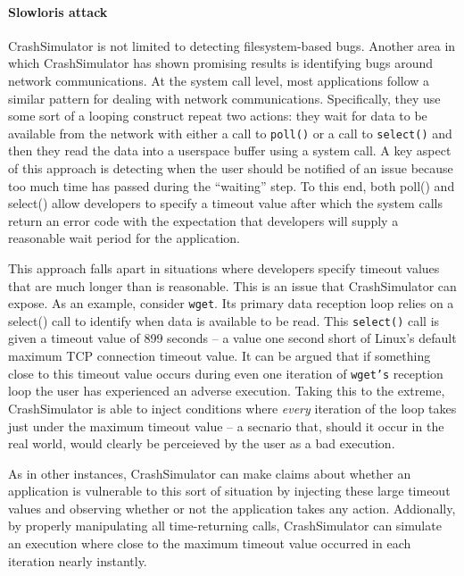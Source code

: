 \paragraph{Slowloris attack}

CrashSimulator is not limited to detecting filesystem-based bugs.  Another area in which CrashSimulator has
shown promising results is identifying bugs around network communications.  At the system call level, most
applications follow a similar pattern for dealing with network communications.  Specifically, they use some
sort of a looping construct repeat two actions: they wait for data to be available from the network with
either a call to {\tt poll()} or a call to {\tt select()} and then they read the data into a userspace
buffer using a system call.  A key aspect of this approach is detecting when the user should be notified of
an issue because too much time has passed during the ``waiting'' step.  To this end, both poll() and
select() allow developers to specify a timeout value after which the system calls return an error code with
the expectation that developers will supply a reasonable wait period for the application.

This approach falls apart in situations where developers specify timeout values that are much longer than is
reasonable.  This is an issue that CrashSimulator can expose.  As an example, consider {\tt wget}.  Its
primary data reception loop relies on a select() call to identify when data is available to be read.  This
{\tt select()} call is given a timeout value of 899 seconds -- a value one second short of Linux's default
maximum TCP connection timeout value.  It can be argued that if something close to this timeout value
occurs during even one iteration of {\tt wget's} reception loop the user has experienced an adverse
execution.  Taking this to the extreme, CrashSimulator is able to inject conditions where \emph{every}
iteration of the loop takes just under the maximum timeout value -- a secnario that, should it occur in the
real world, would clearly be perceieved by the user as a bad execution.

As in other instances, CrashSimulator can make claims about whether an application is vulnerable to this
sort of situation by injecting these large timeout values and observing whether or not the application takes
any action.  Addionally, by properly manipulating all time-returning calls, CrashSimulator can simulate an
execution where close to the maximum timeout value occurred in each iteration nearly instantly.

